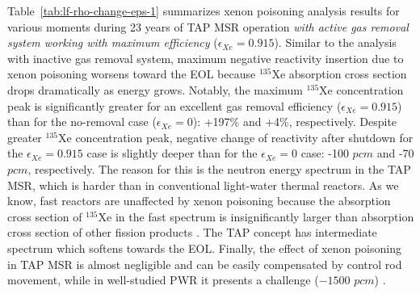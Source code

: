 Table~\ref{tab:lf-rho-change-eps-1}  summarizes xenon poisoning analysis 
results for various moments during 23 years of \gls{TAP} \gls{MSR} operation 
\emph{with active gas removal system working with maximum efficiency}
($\epsilon_{Xe}=0.915$). Similar to the analysis with inactive gas removal 
system, maximum negative reactivity insertion due to xenon poisoning worsens 
toward the \gls{EOL} because $^{135}$Xe absorption cross section drops 
dramatically as energy grows. Notably, 
the maximum $^{135}$Xe concentration peak is significantly greater for an 
excellent gas removal efficiency ($\epsilon_{Xe}=0.915$) than for the 
no-removal case ($\epsilon_{Xe}=0$): +197\% and +4\%, respectively. Despite 
greater $^{135}$Xe concentration peak, negative change of reactivity after 
shutdown for the $\epsilon_{Xe}=0.915$ case is slightly deeper than for the 
$\epsilon_{Xe}=0$ case: -100 $pcm$ and -70 $pcm$, respectively. The reason for 
this is the neutron energy spectrum in the \gls{TAP} \gls{MSR}, which is 
harder than in conventional light-water thermal reactors. As we know, 
fast reactors are unaffected by xenon poisoning because the absorption cross 
section of $^{135}$Xe in the fast spectrum is insignificantly larger than 
absorption cross section of other fission products \cite{bell_nuclear_1970, 
svanstrom_load_2016-2}. The \gls{TAP} concept has intermediate spectrum which 
softens towards the \gls{EOL}. Finally, the effect of xenon 
poisoning in \gls{TAP} \gls{MSR} is almost negligible and can be easily 
compensated by control rod movement, while in well-studied \gls{PWR} it 
presents a challenge ($-1500$ $pcm$) \cite{rykhlevskii_impact_2019}.
